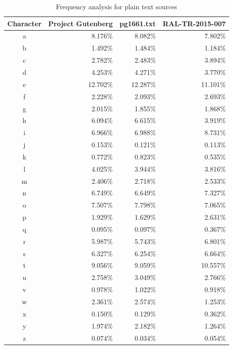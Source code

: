 \documentclass[a4paper]{article}
\begin{document}
\begin{table}[h]
  \centering
  \scriptsize
  \begin{tabular}{crrr}
    \toprule
    Character & Project Gutenberg & pg1661.txt & RAL-TR-2015-007 \\
    \midrule
    a         & 8.176\%           & 8.082\%    & 7.802\%         \\
    b         & 1.492\%           & 1.484\%    & 1.184\%         \\
    c         & 2.782\%           & 2.483\%    & 3.894\%         \\
    d         & 4.253\%           & 4.271\%    & 3.770\%         \\
    e         & 12.702\%          & 12.287\%   & 11.101\%        \\
    f         & 2.228\%           & 2.093\%    & 2.693\%         \\
    g         & 2.015\%           & 1.855\%    & 1.868\%         \\
    h         & 6.094\%           & 6.615\%    & 3.919\%         \\
    i         & 6.966\%           & 6.988\%    & 8.731\%         \\
    j         & 0.153\%           & 0.121\%    & 0.113\%         \\
    k         & 0.772\%           & 0.823\%    & 0.535\%         \\
    l         & 4.025\%           & 3.944\%    & 3.816\%         \\
    m         & 2.406\%           & 2.718\%    & 2.533\%         \\
    n         & 6.749\%           & 6.649\%    & 7.327\%         \\
    o         & 7.507\%           & 7.798\%    & 7.065\%         \\
    p         & 1.929\%           & 1.629\%    & 2.631\%         \\
    q         & 0.095\%           & 0.097\%    & 0.367\%         \\
    r         & 5.987\%           & 5.743\%    & 6.801\%         \\
    s         & 6.327\%           & 6.254\%    & 6.664\%         \\
    t         & 9.056\%           & 9.059\%    & 10.557\%        \\
    u         & 2.758\%           & 3.049\%    & 2.766\%         \\
    v         & 0.978\%           & 1.022\%    & 0.918\%         \\
    w         & 2.361\%           & 2.574\%    & 1.253\%         \\
    x         & 0.150\%           & 0.129\%    & 0.362\%         \\
    y         & 1.974\%           & 2.182\%    & 1.264\%         \\
    z         & 0.074\%           & 0.034\%    & 0.054\%         \\
    \bottomrule
  \end{tabular}
  \caption{Frequency analysis for plain text sources}
  \label{table:plain_text_frequency_analysis}
\end{table}
\end{document}
